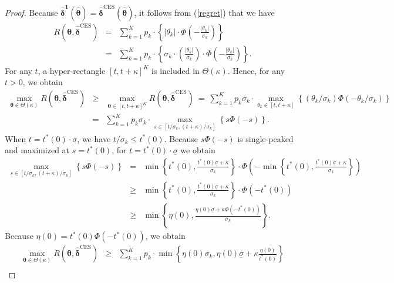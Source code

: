 \documentclass[10pt,a4paper]{amsart}
\begin{document}
\begin{proof}
Because $\hat{\bm{\delta}}^{\bm{1}}(\hat{\bm{\theta}}) = \hat{\bm{\delta}}^{\text{CES}}(\hat{\bm{\theta}})$, it follows from (\ref{regret}) that we have
\begin{eqnarray*}
R(\bm{\theta},\hat{\bm{\delta}}^{\text{CES}}) &=&  \sum_{k=1}^K p_k \cdot \left\{ |\theta_k| \cdot  \Phi \left( -   \frac{|\theta_k|}{\sigma_k} \right) \right\} \\
&=& \sum_{k=1}^K p_k \cdot \left\{ \sigma_k \cdot \left( \frac{|\theta_k|}{\sigma_k} \right) \cdot  \Phi \left( -   \frac{|\theta_k|}{\sigma_k} \right) \right\}.
\end{eqnarray*}
For any $t$, a hyper-rectangle $[t,t+\kappa]^K$ is included in $\Theta(\kappa)$. Hence, for any $t>0$, we obtain
\begin{eqnarray*}
\max_{\bm{\theta} \in \Theta(\kappa)} R(\bm{\theta},\hat{\bm{\delta}}^{\text{CES}}) & \geq & \max_{\bm{\theta} \in [t,t+\kappa]^K} R(\bm{\theta},\hat{\bm{\delta}}^{\text{CES}}) \ = \ \sum_{k=1}^K p_k \sigma_k \cdot \max_{\theta_k \in [t,t+\kappa]} \left\{ (\theta_k / \sigma_k) \Phi(-\theta_k / \sigma_k) \right\} \\
&=&  \sum_{k=1}^K p_k \sigma_k \cdot \max_{s \in [t/\sigma_k,(t+\kappa)/\sigma_k]} \left\{ s \Phi(-s) \right\}.
\end{eqnarray*}
When $t = t^{\ast}(0) \cdot \underline{\sigma}$, we have $t/\sigma_k \leq t^{\ast}(0)$. Because $s \Phi(-s)$ is single-peaked and maximized at $s = t^{\ast}(0)$, for $t = t^{\ast}(0) \cdot \underline{\sigma}$ we obtain
\begin{eqnarray*}
\max_{s \in [t/\sigma_k,(t+\kappa)/\sigma_k]} \left\{ s \Phi(-s) \right\} &=& \min \left\{ t^{\ast}(0), \frac{t^{\ast}(0)\underline{\sigma}+\kappa}{\sigma_k} \right\} \cdot \Phi \left( - \min \left\{ t^{\ast}(0), \frac{t^{\ast}(0)\underline{\sigma}+\kappa}{\sigma_k} \right\} \right) \\
& \geq &  \min \left\{ t^{\ast}(0), \frac{t^{\ast}(0)\underline{\sigma}+\kappa}{\sigma_k} \right\} \cdot \Phi(-t^{\ast}(0)) \\
& \geq & \min \left\{ \eta(0), \frac{\eta(0) \underline{\sigma} + \kappa \Phi(-t^{\ast}(0))}{\sigma_k} \right\}.
\end{eqnarray*}
Because $\eta(0) = t^{\ast}(0) \Phi(-t^{\ast}(0))$, we obtain
\begin{eqnarray}
\max_{\bm{\theta} \in \Theta(\kappa)} R(\bm{\theta},\hat{\bm{\delta}}^{\text{CES}}) & \geq & \sum_{k=1}^K p_k \cdot \min \left\{ \eta(0) \sigma_k,  \eta(0) \underline{\sigma} + \kappa \frac{\eta(0)}{t^{\ast}(0)} \right\} \nonumber \\

\end{eqnarray}
\end{proof}
\end{document}
